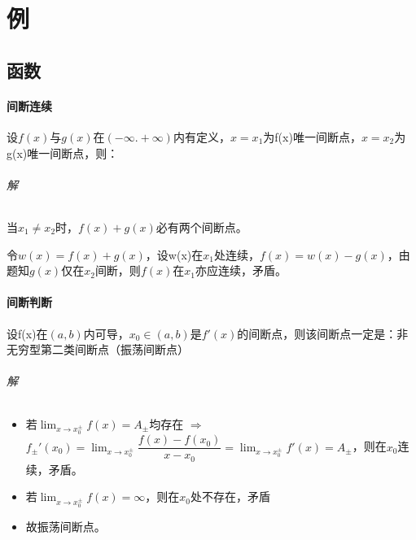 
\chapter{例}

\section{函数}

\subsubsection{间断连续}
设\(f(x)\)与\(g(x)\)在\((-\infty. +\infty)\)内有定义，\(x = x_1\)为f(x)唯一间断点，\(x = x_2\)为g(x)唯一间断点，则：
\subparagraph{解}
当\(x_1 \neq x_2\)时，\(f(x) + g(x)\)必有两个间断点。

令\(w(x) = f(x) + g(x)\)，设w(x)在\(x_1\)处连续，\(f(x) = w(x) - g(x)\)，由题知\(g(x)\)仅在\(x_2\)间断，则\(f(x)\)在\(x_1\)亦应连续，矛盾。


\subsubsection{间断判断}
设f(x)在\((a, b)\)内可导，\(x_0 \in (a, b)\)是\(f'(x)\)的间断点，则该间断点一定是：非无穷型第二类间断点（振荡间断点）
\subparagraph{解}
\begin{itemize}
    \item 若\(\displaystyle\lim_{x \to x_0^{\pm}}f(x) = A_{\pm}\)均存在 \(\Rightarrow\) \(f_{\pm}'(x_0) = \displaystyle\lim_{x \to x_0^{\pm}}\dfrac{f(x) - f(x_0)}{x - x_0} = \displaystyle\lim_{x \to x_0^{\pm}}f'(x) = A_{\pm}\)，则在\(x_0\)连续，矛盾。
    \item 若\(\displaystyle\lim_{x \to x_0^{\pm}}f(x) = \infty\)，则在\(x_0\)处不存在，矛盾
    \item 故振荡间断点。
\end{itemize}
